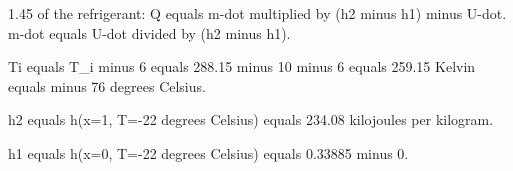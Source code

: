 1.45 of the refrigerant:  
Q equals m-dot multiplied by (h2 minus h1) minus U-dot.  
m-dot equals U-dot divided by (h2 minus h1).  

Ti equals T_i minus 6 equals 288.15 minus 10 minus 6 equals 259.15 Kelvin equals minus 76 degrees Celsius.  

h2 equals h(x=1, T=-22 degrees Celsius) equals 234.08 kilojoules per kilogram.  

h1 equals h(x=0, T=-22 degrees Celsius) equals 0.33885 minus 0.